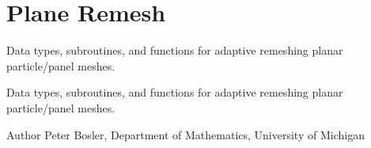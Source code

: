 \hypertarget{group___plane_remesh}{\section{Plane Remesh}
\label{group___plane_remesh}
}


Data types, subroutines, and functions for adaptive remeshing planar particle/panel meshes.  


Data types, subroutines, and functions for adaptive remeshing planar particle/panel meshes. 

\begin{DoxyAuthor}{Author}
Peter Bosler, Department of Mathematics, University of Michigan 
\end{DoxyAuthor}
